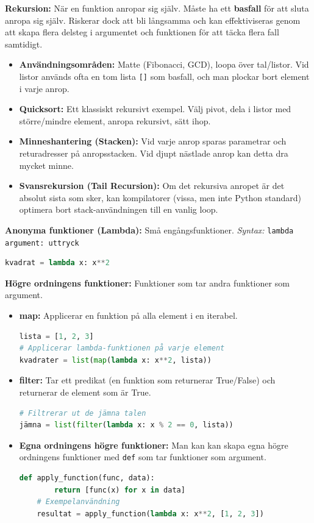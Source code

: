 \documentclass{article}
\begin{document}
\textbf{Rekursion:}
När en funktion anropar sig själv. Måste ha ett \textbf{basfall} för att sluta anropa sig själv. Riskerar dock att bli långsamma och kan effektiviseras genom att skapa flera delsteg i argumentet och funktionen för att täcka flera fall samtidigt.
\begin{itemize}
    \item \textbf{Användningsområden:} Matte (Fibonacci, GCD), loopa över tal/listor. Vid listor används ofta en tom lista \texttt{[]} som basfall, och man plockar bort element i varje anrop.
    \item \textbf{Quicksort:} Ett klassiskt rekursivt exempel. Välj pivot, dela i listor med större/mindre element, anropa rekursivt, sätt ihop.
    \item \textbf{Minneshantering (Stacken):} Vid varje anrop sparas parametrar och returadresser på anropsstacken. Vid djupt nästlade anrop kan detta dra mycket minne.
    \item \textbf{Svansrekursion (Tail Recursion):} Om det rekursiva anropet är det absolut sista som sker, kan kompilatorer (vissa, men inte Python standard) optimera bort stack-användningen till en vanlig loop.
\end{itemize}

\textbf{Anonyma funktioner (Lambda):}
Små engångsfunktioner.
\textit{Syntax:} \texttt{lambda argument: uttryck}
\begin{lstlisting}[language=Python]
kvadrat = lambda x: x**2
\end{lstlisting}

\textbf{Högre ordningens funktioner:}
Funktioner som tar andra funktioner som argument.
\begin{itemize}
    \item \textbf{map:} Applicerar en funktion på alla element i en iterabel.
    \begin{lstlisting}[language=Python]
lista = [1, 2, 3]
# Applicerar lambda-funktionen på varje element
kvadrater = list(map(lambda x: x**2, lista)) 
    \end{lstlisting}
    \item \textbf{filter:} Tar ett predikat (en funktion som returnerar True/False) och returnerar de element som är True.
    \begin{lstlisting}[language=Python]
# Filtrerar ut de jämna talen
jämna = list(filter(lambda x: x % 2 == 0, lista))
    \end{lstlisting}
    \item \textbf{Egna ordningens högre funktioner:} Man kan kan skapa egna högre ordningens funktioner med \texttt{def} som tar funktioner som argument.
    \begin{lstlisting}[language=Python]
    def apply_function(func, data):
        return [func(x) for x in data]
    # Exempelanvändning
    resultat = apply_function(lambda x: x**2, [1, 2, 3])
    \end{lstlisting}
\end{itemize}
\end{document}
